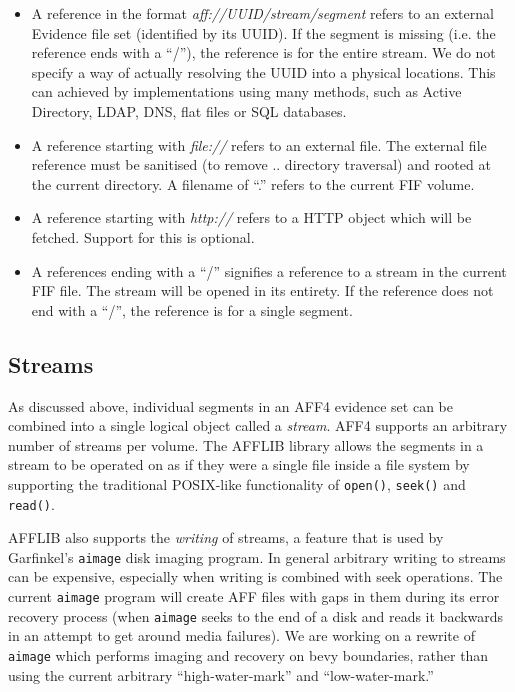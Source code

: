 \documentclass[10pt, conference]{IEEEtran}
\begin{document}
\begin{itemize}
\item A reference in the format {\em aff://UUID/stream/segment} refers
to an external Evidence file set (identified by its UUID). If the segment
is missing (i.e. the reference ends with a ``/''), the reference is
for the entire stream. We do not specify a way of actually resolving
the UUID into a physical locations. This can achieved by
implementations using many methods, such as Active Directory, LDAP,
DNS, flat files or SQL databases.

\item A reference starting with {\em file://} refers to an external
file. The external file reference must be sanitised (to remove
.. directory traversal) and rooted at the current directory. A
filename of ``.'' refers to the current FIF volume.

\item A reference starting with {\em http://} refers to a HTTP
object which will be fetched. Support for this is optional.

\item A references ending with a ``/'' signifies a reference to a
stream in the current FIF file. The stream will be opened in its
entirety. If the reference does not end with a ``/'', the reference is
for a single segment.
\end{itemize}

\subsection{Streams}
As discussed above, individual segments in an AFF4 evidence set can be
combined into a single logical object called a \emph{stream}. AFF4
supports an arbitrary number of streams per volume. The AFFLIB library
allows the segments in a stream to be operated on as if they were a
single file inside a file system by supporting the traditional
POSIX-like functionality of \texttt{open()}, \texttt{seek()} and
\texttt{read()}.

AFFLIB also supports the \emph{writing} of streams, a feature that is
used by Garfinkel's \texttt{aimage} disk imaging program. In general
arbitrary writing to streams can be expensive, especially when writing
is combined with seek operations. The current \texttt{aimage} program
will create AFF files with gaps in them during its error recovery
process (when \texttt{aimage} seeks to the end of a disk and reads it
backwards in an attempt to get around media failures). We are working
on a rewrite of \texttt{aimage} which performs imaging and recovery
on bevy boundaries, rather than using the current arbitrary
``high-water-mark'' and ``low-water-mark.''
\end{document}
